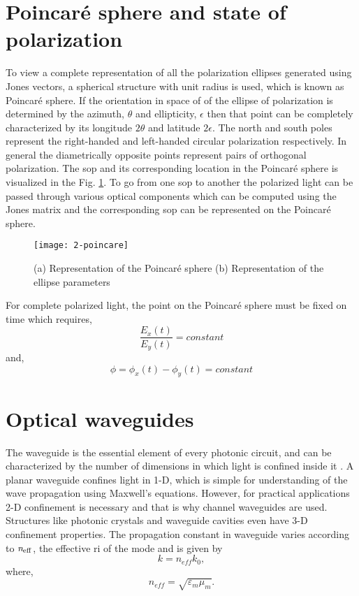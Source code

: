 \documentclass[../report.tex]{subfiles}
\begin{document}
\section{Poincaré sphere and state of polarization} \label{concept:poincare_sphare}
To view a complete representation of all the polarization ellipses generated using Jones vectors, a spherical structure with unit radius is used, which is known as Poincaré sphere. If the orientation in space of of the ellipse of polarization is determined by the azimuth, $\theta$ and ellipticity, $\epsilon$ then that point can be completely characterized by its longitude $2\theta$ and latitude $2\epsilon$. The north and south poles represent the right-handed and left-handed circular polarization respectively. In general the diametrically opposite points represent pairs of orthogonal polarization. The \gls{sop} and its corresponding location in the Poincaré sphere is visualized in the Fig. \ref{fig:2_poincare}. To go from one \gls{sop} to another the polarized light can be passed through various optical components which can be computed using the Jones matrix and the corresponding \gls{sop} can be represented on the Poincaré sphere. 

\begin{figure}[H]
	\centering
	\texttt{[image: 2-poincare]}
	\caption{(a) Representation of the Poincaré sphere (b) Representation of the ellipse parameters \cite{flossmann_stokes_2006}}
	\label{fig:2_poincare}
\end{figure}
\noindent For complete polarized light, the point on the Poincaré sphere must be fixed on time which requires,
\begin{equation}\label{eq:polarization_condition_1}
\dfrac {E_{x}\left( t\right) } {E_{y}\left( t\right) }=constant
\end{equation}
and,
\begin{equation}\label{eq:polarization_condition_2}
\phi = \phi_{x}(t) - \phi_{y}(t)=constant
\end{equation}
	
		\section{Optical waveguides}
The waveguide is the essential element of every photonic circuit, and can be characterized by the number of dimensions in which light is confined inside it \cite{reed_silicon_2008}. A planar waveguide confines light in 1-D, which is simple for understanding of the wave propagation using Maxwell's equations. However, for practical applications 2-D confinement is necessary and that is why channel waveguides are used. Structures like photonic crystals and waveguide cavities even have 3-D confinement properties. The propagation constant in waveguide varies according to $\mathrm{\textit{n}_{eff}}$, the effective \gls{ri} of the mode and is given by 
\begin{equation}\label{eq:propagation_const_med_val}
k = n_{eff}k_0,
\end{equation}
where,
\begin{equation}\label{eq:ri_med_val}
n_{eff} = \sqrt {\varepsilon _{m}\mu _{m}}.
\end{equation}  			
\end{document}
